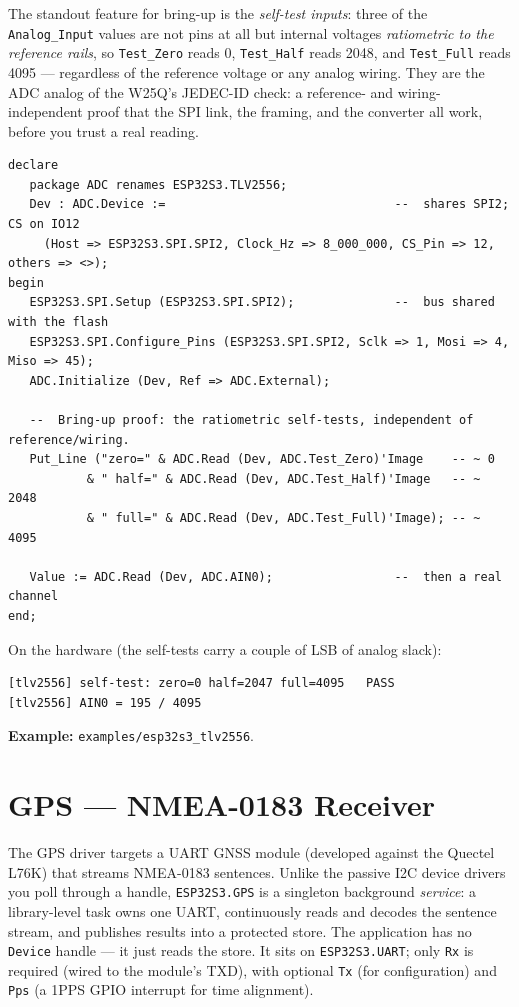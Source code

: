 The standout feature for bring-up is the \emph{self-test inputs}: three of the
\texttt{Analog\_Input} values are not pins at all but internal voltages
\emph{ratiometric to the reference rails}, so \texttt{Test\_Zero} reads 0,
\texttt{Test\_Half} reads 2048, and \texttt{Test\_Full} reads 4095 --- regardless
of the reference voltage or any analog wiring. They are the ADC analog of the
W25Q's JEDEC-ID check: a reference- and wiring-independent proof that the SPI link,
the framing, and the converter all work, before you trust a real reading.

\begin{lstlisting}
declare
   package ADC renames ESP32S3.TLV2556;
   Dev : ADC.Device :=                                --  shares SPI2; CS on IO12
     (Host => ESP32S3.SPI.SPI2, Clock_Hz => 8_000_000, CS_Pin => 12, others => <>);
begin
   ESP32S3.SPI.Setup (ESP32S3.SPI.SPI2);              --  bus shared with the flash
   ESP32S3.SPI.Configure_Pins (ESP32S3.SPI.SPI2, Sclk => 1, Mosi => 4, Miso => 45);
   ADC.Initialize (Dev, Ref => ADC.External);

   --  Bring-up proof: the ratiometric self-tests, independent of reference/wiring.
   Put_Line ("zero=" & ADC.Read (Dev, ADC.Test_Zero)'Image    -- ~ 0
           & " half=" & ADC.Read (Dev, ADC.Test_Half)'Image   -- ~ 2048
           & " full=" & ADC.Read (Dev, ADC.Test_Full)'Image); -- ~ 4095

   Value := ADC.Read (Dev, ADC.AIN0);                 --  then a real channel
end;
\end{lstlisting}

On the hardware (the self-tests carry a couple of LSB of analog slack):

\begin{lstlisting}[style=sh]
[tlv2556] self-test: zero=0 half=2047 full=4095   PASS
[tlv2556] AIN0 = 195 / 4095
\end{lstlisting}

\noindent\textbf{Example:} \texttt{examples/esp32s3\_tlv2556}.

\section{GPS --- NMEA-0183 Receiver}
\label{app:ext:gps}

The GPS driver targets a UART GNSS module (developed against the Quectel L76K) that
streams NMEA-0183 sentences. Unlike the passive I2C device drivers you poll through
a handle, \texttt{ESP32S3.GPS} is a singleton background \emph{service}: a
library-level task owns one UART, continuously reads and decodes the sentence
stream, and publishes results into a protected store. The application has no
\texttt{Device} handle --- it just reads the store. It sits on \texttt{ESP32S3.UART};
only \texttt{Rx} is required (wired to the module's TXD), with optional \texttt{Tx}
(for configuration) and \texttt{Pps} (a 1PPS GPIO interrupt for time alignment).

